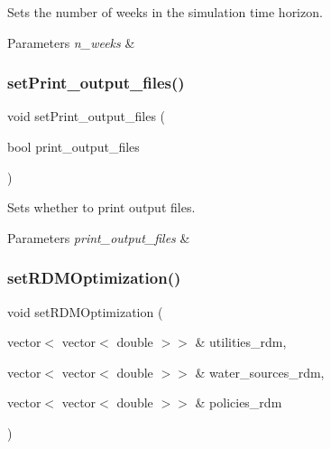 Sets the number of weeks in the simulation time horizon. 


\begin{DoxyParams}{Parameters}
{\em n\+\_\+weeks} & \\
\hline
\end{DoxyParams}
\mbox{\label{classProblem_a9e1298432a894cbe8d373bac24edb5cf_a9e1298432a894cbe8d373bac24edb5cf}} 
\subsubsection{\texorpdfstring{set\+Print\+\_\+output\+\_\+files()}{setPrint\_output\_files()}}
{\footnotesize\ttfamily void set\+Print\+\_\+output\+\_\+files (\begin{DoxyParamCaption}\item[{bool}]{print\+\_\+output\+\_\+files }\end{DoxyParamCaption})}



Sets whether to print output files. 


\begin{DoxyParams}{Parameters}
{\em print\+\_\+output\+\_\+files} & \\
\hline
\end{DoxyParams}
\mbox{\label{classProblem_a08d3f34a593cb07851d1c3f3ad9d5160_a08d3f34a593cb07851d1c3f3ad9d5160}} 
\subsubsection{\texorpdfstring{set\+R\+D\+M\+Optimization()}{setRDMOptimization()}}
{\footnotesize\ttfamily void set\+R\+D\+M\+Optimization (\begin{DoxyParamCaption}\item[{vector$<$ vector$<$ double $>$$>$ \&}]{utilities\+\_\+rdm,  }\item[{vector$<$ vector$<$ double $>$$>$ \&}]{water\+\_\+sources\+\_\+rdm,  }\item[{vector$<$ vector$<$ double $>$$>$ \&}]{policies\+\_\+rdm }\end{DoxyParamCaption})}



